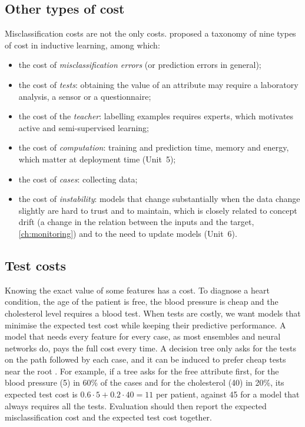 \subsection{Other types of cost}

Misclassification costs are not the only costs. \citet{turney2000types} proposed a taxonomy of
nine types of cost in inductive learning, among which:
\begin{itemize}
  \item the cost of \emph{misclassification errors} (or prediction errors in general);
  \item the cost of \emph{tests}: obtaining the value of an attribute may require a laboratory
        analysis, a sensor or a questionnaire;
  \item the cost of the \emph{teacher}: labelling examples requires experts, which motivates
        active and semi-supervised learning;
  \item the cost of \emph{computation}: training and prediction time, memory and energy, which
        matter at deployment time (Unit~5);
  \item the cost of \emph{cases}: collecting data;
  \item the cost of \emph{instability}: models that change substantially when the data change
        slightly are hard to trust and to maintain, which is closely related to concept drift (a change in the relation between the inputs and the target, \cref{ch:monitoring})
        and to the need to update models (Unit~6).
\end{itemize}

\subsection{Test costs}

Knowing the exact value of some features has a cost. To diagnose a heart condition, the age of
the patient is free, the blood pressure is cheap and the cholesterol level requires a blood test.
When tests are costly, we want models that minimise the expected test cost while keeping their
predictive performance. A model that needs every feature for every case, as most ensembles and
neural networks do, pays the full cost every time. A decision tree only asks for the tests on
the path followed by each case, and it can be induced to prefer cheap tests near the root
\citep{nunez1991use,turney1995cost}. For example, if a tree asks for the free attribute first,
for the blood pressure (5\EUR) in 60\% of the cases and for the cholesterol (40\EUR) in 20\%,
its expected test cost is $0.6\cdot5+0.2\cdot40=11$\EUR{} per patient, against 45\EUR{} for a
model that always requires all the tests. Evaluation should then report the expected
misclassification cost and the expected test cost together.


